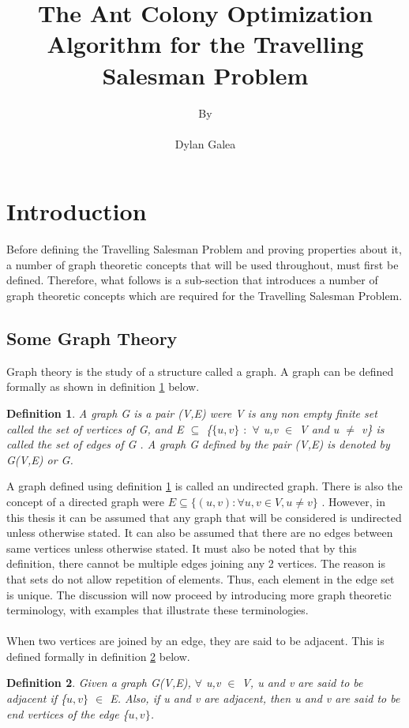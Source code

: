 \documentclass[12pt]{article}
\title{The Ant Colony Optimization Algorithm for the Travelling Salesman Problem}
\author{By\\\\Dylan Galea}
\newtheorem{definition}{Definition}[subsection]
\numberwithin{equation}{subsection}
\numberwithin{table}{subsection}
\begin{document}
\maketitle
\newpage
\tableofcontents
\newpage
\section{Introduction}
Before defining the Travelling Salesman Problem and proving properties about it, a number of graph theoretic concepts that will be used throughout, must first be defined. Therefore, what follows is a sub-section that introduces a number of graph theoretic concepts which are required for the Travelling Salesman Problem.
\subsection{Some Graph Theory}
Graph theory is the study of a structure called a graph. A graph can be defined formally as shown in definition \ref{Graph} below.
\begin{definition}
\label{Graph}
A graph G is a pair (V,E) were V is any non empty finite set called the set of vertices of G, and E $\subseteq$ \{$\{u,v\}$ $:$ $\forall$ u,v $\in$ V and u $\neq$ v\} is called the set of edges of G {}. A graph G defined by the pair (V,E) is denoted by G(V,E) or G.
\end{definition}
A graph defined using definition \ref{Graph} is called an undirected graph. There is also the concept of a directed graph were $\mathit{E \subseteq \{(u,v) : \forall u,v \in V, u \neq v\}}$ \cite{black_tanenbaum_2017}. However, in this thesis it can be assumed that any graph that will be considered is undirected unless otherwise stated. It can also be assumed that there are no edges between same vertices unless otherwise stated. It must also be noted that by this definition, there cannot be multiple edges joining any 2 vertices. The reason is that sets do not allow repetition of elements. Thus, each element in the edge set is unique. The discussion will now proceed by introducing more graph theoretic terminology, with examples that illustrate these terminologies.\\
\\When two vertices are joined by an edge, they are said to be adjacent. This is defined formally in definition \ref{adjacent} below.
\begin{definition}
\label{adjacent}
Given a graph G(V,E), $\forall$ u,v $\in$ V, u and v are said to be adjacent if \{$u,v\}$ $\in$ E. Also, if u and v are adjacent, then u and v are said to be end vertices of the edge \{$u,v\}$. 
\end{definition}
\end{document}
